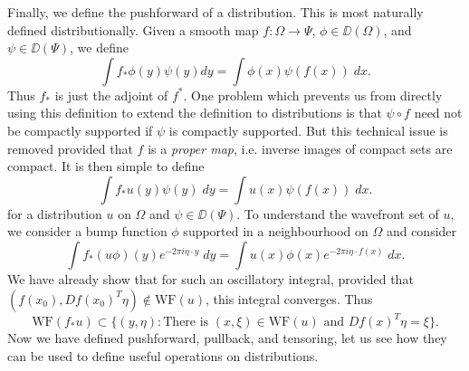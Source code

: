 Finally, we define the pushforward of a distribution. This is most naturally defined distributionally. Given a smooth map $f: \Omega \to \Psi$, $\phi \in \DD(\Omega)$, and $\psi \in \DD(\Psi)$, we define
%
\[ \int f_* \phi(y) \psi(y) dy = \int \phi(x) \psi(f(x))\; dx. \]
%
Thus $f_*$ is just the adjoint of $f^*$. One problem which prevents us from directly using this definition to extend the definition to distributions is that $\psi \circ f$ need not be compactly supported if $\psi$ is compactly supported. But this technical issue is removed provided that $f$ is a \emph{proper map}, i.e. inverse images of compact sets are compact. It is then simple to define
%
\[ \int f_* u(y) \psi(y)\; dy = \int u(x) \psi(f(x))\; dx. \]
%
for a distribution $u$ on $\Omega$ and $\psi \in \DD(\Psi)$. To understand the wavefront set of $u$, we consider a bump function $\phi$ supported in a neighbourhood  on $\Omega$ and consider
%
\[ \int f_*(u \phi)(y) e^{-2 \pi i \eta \cdot y}\; dy = \int u(x) \phi(x) e^{-2 \pi i \eta \cdot f(x)}\; dx. \]
%
We have already show that for such an oscillatory integral, provided that $(f(x_0),Df(x_0)^T \eta) \not \in \text{WF}(u)$, this integral converges. Thus
%
\[ \text{WF}(f_* u) \subset \{ (y,\eta) : \text{There is $(x,\xi) \in \text{WF}(u)$ and $Df(x)^T \eta = \xi$} \}. \]
%
Now we have defined pushforward, pullback, and tensoring, let us see how they can be used to define useful operations on distributions.

